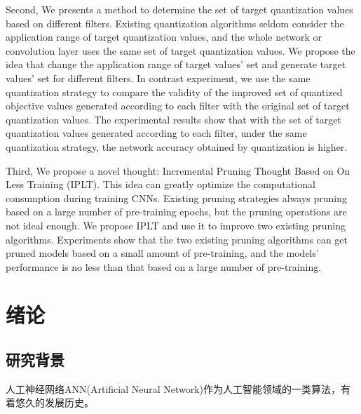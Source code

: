 \documentclass[ pdftex, oneside, master]{NJUthesis}
\begin{document}
\begin{englishabstract}
Second, We presents a method to determine the set of target quantization values based on different filters. Existing quantization algorithms seldom consider the application range of target quantization values, and the whole network or convolution layer uses the same set of target quantization values. We propose the idea that change the application range of target values' set and generate target values' set for different filters. In contrast experiment, we use the same quantization strategy to compare the validity of the improved set of quantized objective values generated according to each filter with the original set of target quantization values. The experimental results show that with the set of target quantization values generated according to each filter, under the same quantization strategy, the network accuracy obtained by quantization is higher.



Third, We propose a novel thought: Incremental Pruning Thought Based on On Less Training (IPLT). This idea can greatly optimize the computational consumption during training CNNs. Existing pruning strategies always pruning based on a large number of pre-training epochs, but the pruning operations are not ideal enough. We propose IPLT and use it to improve two existing pruning algorithms. Experiments show that the two existing pruning algorithms can get pruned models based on a small amount of pre-training, and the models' performance is no less than that based on a large number of pre-training.


\end{englishabstract}

\tableofcontents

\listoftables
\listoffigures


\mainmatter

\chapter{绪论}

\section{研究背景}
人工神经网络ANN(Artificial Neural Network)作为人工智能领域的一类算法，有着悠久的发展历史。
\end{document}
